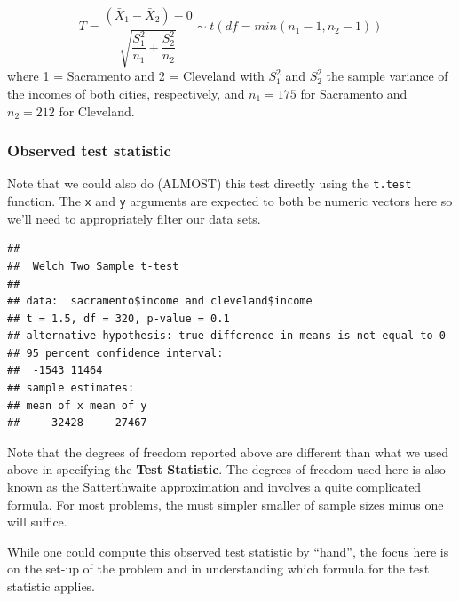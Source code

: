 \documentclass[]{tufte-book}
\newenvironment{Shaded}{\begin{snugshade}}{\end{snugshade}}
\newcommand{\KeywordTok}[1]{\textcolor[rgb]{0.13,0.29,0.53}{\textbf{{#1}}}}
\newcommand{\DataTypeTok}[1]{\textcolor[rgb]{0.13,0.29,0.53}{{#1}}}
\newcommand{\StringTok}[1]{\textcolor[rgb]{0.31,0.60,0.02}{{#1}}}
\newcommand{\NormalTok}[1]{{#1}}
\theoremstyle{definition}
\theoremstyle{definition}
\theoremstyle{remark}
\begin{document}
\[ T =\dfrac{ (\bar{X}_1 - \bar{X}_2) - 0}{ \sqrt{\dfrac{S_1^2}{n_1} + \dfrac{S_2^2}{n_2}}  } \sim t (df = min(n_1 - 1, n_2 - 1)) \]
where 1 = Sacramento and 2 = Cleveland with \(S_1^2\) and \(S_2^2\) the
sample variance of the incomes of both cities, respectively, and
\(n_1 = 175\) for Sacramento and \(n_2 = 212\) for Cleveland.

\subsubsection{Observed test statistic}\label{observed-test-statistic-3}

Note that we could also do (ALMOST) this test directly using the
\texttt{t.test} function. The \texttt{x} and \texttt{y} arguments are
expected to both be numeric vectors here so we'll need to appropriately
filter our data sets.

\begin{Shaded}
\end{Shaded}

\begin{verbatim}
## 
##  Welch Two Sample t-test
## 
## data:  sacramento$income and cleveland$income
## t = 1.5, df = 320, p-value = 0.1
## alternative hypothesis: true difference in means is not equal to 0
## 95 percent confidence interval:
##  -1543 11464
## sample estimates:
## mean of x mean of y 
##     32428     27467
\end{verbatim}

Note that the degrees of freedom reported above are different than what
we used above in specifying the \textbf{Test Statistic}. The degrees of
freedom used here is also known as the Satterthwaite approximation and
involves a quite complicated formula. For most problems, the must
simpler smaller of sample sizes minus one will suffice.

While one could compute this observed test statistic by ``hand'', the
focus here is on the set-up of the problem and in understanding which
formula for the test statistic applies.
\end{document}
